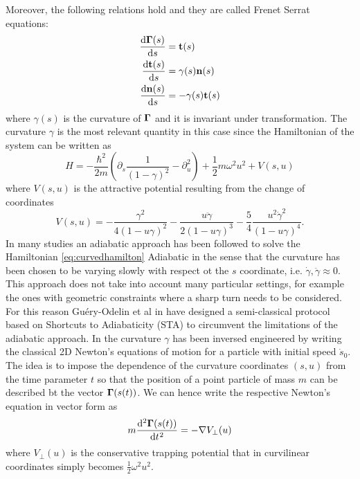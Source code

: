 Moreover, the following relations hold and they are called Frenet Serrat equations:
\begin{align}
	\diff{\Ga(s)}{s}  &= \mathbf{t}(s) \label{eq:frenet1}\\ 
	\diff{\mathbf{t}(s)}{s}  &= \gamma(s)\mathbf{n}(s) \label{eq:frenet2}\\ 
	\diff{\mathbf{n}(s)}{s}  &= -\gamma(s)\mathbf{t}(s) \label{eq:frenet3}
\end{align}
where $\gamma(s)$ is the curvature of $\mathbf{\Gamma}$ and it is invariant under transformation.
The curvature $\gamma$ is the most relevant quantity in this case since the Hamiltonian of the system can be written as 
\begin{equation}
	\label{eq:curvedhamilton}	
	H = - \frac{\hbar^2}{2m} \left( \partial_s \frac{1}{(1-\gamma)^2} - \partial_{u}^{2}\right)
	+ \frac{1}{2} m\omega^2u^2 + V(s,u)
\end{equation}
where $V(s,u)$ is the attractive potential resulting from the change of coordinates 
\begin{equation}
	\label{eq:potential}
	V(s,u) = -\frac{\gamma^2}{4(1-u\gamma)^2} - \frac{u\ddot{\gamma}}{2(1-u\gamma)^3} -\frac{5}{4}\frac{u^2\dot{\gamma}^2}{(1-u\gamma)^4}.
\end{equation}
In many studies an adiabatic approach has been followed to solve the Hamiltonian \eqref{eq:curvedhamilton} 
Adiabatic in the sense that the curvature has been chosen to be varying slowly with respect ot the $s$ coordinate, i.e. $\dot{\gamma}, \ddot{\gamma} \approx 0 $.
This approach does not take into account many particular settings, for example the ones with geometric constraints where a sharp turn needs to be considered.
For this reason Gu\'ery-Odelin et al in \cite{QuantumControlImpens2020} have designed a semi-classical protocol based on Shortcuts to Adiabaticity (STA) to circumvent the limitations of the adiabatic approach.
In \cite{QuantumControlImpens2020} the curvature $\gamma$ has been inversed engineered by writing the classical 2D Newton's equations of motion for a particle with initial speed $\dot{s}_0$.
The idea is to impose the dependence of the curvature coordinates $(s,u)$ from the time parameter $t$ so that the position of a point particle of mass $m$ can be described bt the vector $\mathbf{\Gamma}(s(t))$.
We can hence write the respective Newton's equation in vector form as 
\begin{equation}
	\label{eq:newtfirstlaw}
	m \diff[2]{\Ga(s(t))} t = - \nabla V_\perp (u)
\end{equation}
where $ V_\perp(u) $ is the conservative trapping potential that in curvilinear coordinates simply becomes $ \frac{1}{2}\omega^2 u^2 $.
